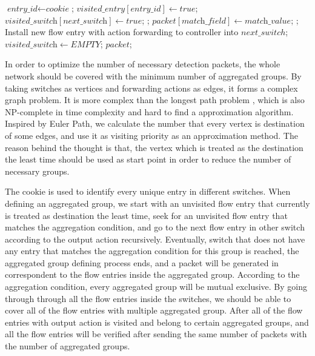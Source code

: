 \begin {tcolorbox}[blanker,float=tbp,
grow to left by=1cm, grow to right by=1cm]
\begin{algorithm}[H]
  \begin{algorithmic}[1]
        \State $\textit{entry\_id} \gets \textit{cookie}$;
          \State $\textit{visited\_entry}[\textit{entry\_id}] \gets true$;
          \State $\textit{visited\_switch}[\textit{next\_switch}] \gets true$;
            \State \Return {};
            \State $\textit{packet}[\textit{match\_field}] \gets \textit{match\_value}$;
            \State \Return {};
          \EndIf
        \EndIf
      \EndFor
      \State Install new flow entry with action forwarding to controller into $next\_switch$;
      \State $\textit{visited\_switch} \gets EMPTY$;
      \State \Return $packet$;
    \EndFunction
  \end{algorithmic}
\end{algorithm}
\end{tcolorbox}

In order to optimize the number of necessary detection packets, the whole network should be covered with the minimum number of aggregated groups. By taking switches as vertices and forwarding actions as edges, it forms a complex graph problem. It is more complex than the longest path problem \cite{DMR97,RU04}, which is also NP-complete in time complexity and hard to find a approximation algorithm. Inspired by Euler Path, we calculate the number that every vertex is destination of some edges, and use it as visiting priority as an approximation method. The reason behind the thought is that, the vertex which is treated as the destination the least time should be used as start point in order to reduce the number of necessary groups.

The cookie is used to identify every unique entry in different switches. When defining an aggregated group, we start with an unvisited flow entry that currently is treated as destination the least time, seek for an unvisited flow entry that matches the aggregation condition, and go to the next flow entry in other switch according to the output action recursively. Eventually, switch that does not have any entry that matches the aggregation condition for this group is reached, the aggregated group defining process ends, and a packet will be generated in correspondent to the flow entries inside the aggregated group. According to the aggregation condition, every aggregated group will be mutual exclusive. By going through through all the flow entries inside the switches, we should be able to cover all of the flow entries with multiple aggregated group. After all of the flow entries with output action is visited and belong to certain aggregated groups, and all the flow entries will be verified after sending the same number of packets with the number of aggregated groups. 

